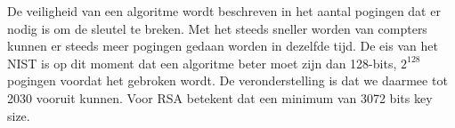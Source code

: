 De veiligheid van een algoritme wordt beschreven in het aantal pogingen dat er nodig is om de sleutel te breken. Met het steeds sneller worden van compters kunnen er steeds meer pogingen gedaan worden in dezelfde tijd. De eis van het NIST is op dit moment dat een algoritme beter moet zijn dan 128-bits, $2^128$ pogingen voordat het gebroken wordt. De veronderstelling is dat we daarmee tot 2030 vooruit kunnen. Voor RSA betekent dat een minimum van 3072 bits key size.

